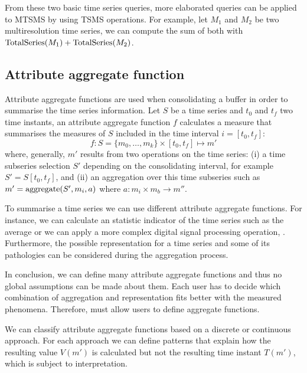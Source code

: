 From these two basic time series queries, more elaborated queries can
be applied to MTSMS by using TSMS operations. For example, let $M_1$
and $M_2$ be two multiresolution time series, we can compute the sum
of both with $\operatorname{TotalSeries}(M_1) + \operatorname{TotalSeries}(M_2)$. 





\subsection{Attribute aggregate function}
\label{sec:model:interpolador}

Attribute aggregate functions are used when consolidating a buffer in
order to summarise the time series information. Let $S$ be a time
series and $t_0$ and $t_f$ two time instants, an attribute aggregate
function $f$ calculates a measure that summarises the measures of $S$
included in the time interval $i=[t_0,t_f]$:
\[
f : S=\{m_0,\ldots,m_k\} \times [t_0,t_f] \mapsto m'
\]
where, generally, $m'$ results from two operations on the time series:
(i) a time subseries selection $S'$ depending on the consolidating
interval, for example $S' = S[t_0,t_f]$, and (ii) an aggregation over
this time subseries such as $m' = \operatorname*{aggregate}(S',m_i, a)$ where $a: m_i \times
m_b \rightarrow m''$.  

To summarise a time series we can use different attribute aggregate
functions.  For instance, we can calculate an statistic indicator of
the time series such as the average or we can apply a more complex
digital signal processing operation, \cite{zhang11}. Furthermore, the
possible representation for a time series and some of its pathologies
can be considered during the aggregation process.


In conclusion, we can define many attribute aggregate functions and
thus no global assumptions can be made about them. Each user has to
decide which combination of aggregation and representation fits better
with the measured phenomena.  Therefore,  must allow users to
define aggregate functions.

We can classify attribute aggregate functions based on a discrete or
continuous approach. For each approach we can define patterns that
explain how the resulting value $V(m')$ is calculated but not the
resulting time instant $T(m')$, which is subject to
interpretation.  



